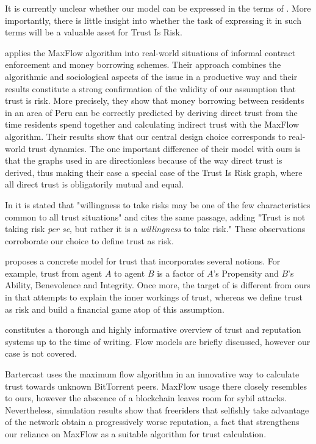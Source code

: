  It is currently unclear whether our model can be expressed in the terms of \cite{sdt}. More importantly, there is little
  insight into whether the task of expressing it in such terms will be a valuable asset for Trust Is Risk.

  \cite{kmrs} applies the MaxFlow algorithm into real-world situations of informal contract enforcement and money borrowing
  schemes. Their approach combines the algorithmic and sociological aspects of the issue in a productive way and their
  results constitute a strong confirmation of the validity of our assumption that trust is risk. More precisely, they show
  that money borrowing between residents in an area of Peru can be correctly predicted by deriving direct trust from the time
  residents spend together and calculating indirect trust with the MaxFlow algorithm. Their results show that our central
  design choice corresponds to real-world trust dynamics. The one important difference of their model with ours is that
  the graphs used in \cite{kmrs} are directionless because of the way direct trust is derived, thus making their case a
  special case of the Trust Is Risk graph, where all direct trust is obligatorily mutual and equal.

  In \cite{jgs} it is stated that "willingness to take risks may be one of the few characteristics common to all trust
  situations" and \cite{mds} cites the same passage, adding "Trust is not taking risk \textit{per se}, but rather it is a
  \textit{willingness} to take risk." These observations corroborate our choice to define trust as risk.

  \cite{mds} proposes a concrete model for trust that incorporates several notions. For example, trust from agent $A$ to
  agent $B$ is a factor of $A$'s Propensity and $B$'s Ability, Benevolence and Integrity. Once more, the target of \cite{mds}
  is different from ours in that \cite{mds} attempts to explain the inner workings of trust, whereas we define trust as risk
  and build a financial game atop of this assumption.

  \cite{jib} constitutes a thorough and highly informative overview of trust and reputation systems up to the time of
  writing. Flow models are briefly discussed, however our case is not covered.

  Bartercast \cite{bartercast} uses the maximum flow algorithm in an innovative way to calculate trust towards unknown
  BitTorrent peers. MaxFlow usage there closely resembles to ours, however the abscence of a blockchain leaves room for
  sybil attacks. Nevertheless, simulation results show that freeriders that selfishly take advantage of the network obtain a
  progressively worse reputation, a fact that strengthens our reliance on MaxFlow as a suitable algorithm for trust
  calculation.

